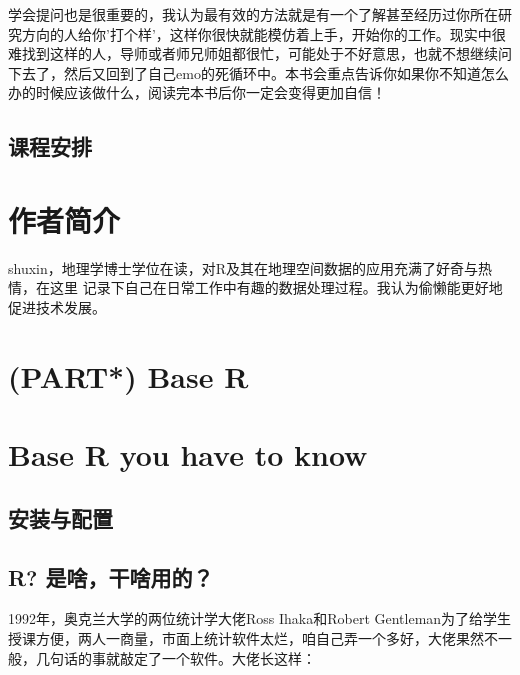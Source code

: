 \documentclass[
]{book}
\begin{document}
学会提问也是很重要的，我认为最有效的方法就是有一个了解甚至经历过你所在研究方向的人给你'打个样'，这样你很快就能模仿着上手，开始你的工作。现实中很难找到这样的人，导师或者师兄师姐都很忙，可能处于不好意思，也就不想继续问下去了，然后又回到了自己emo的死循环中。本书会重点告诉你如果你不知道怎么办的时候应该做什么，阅读完本书后你一定会变得更加自信！

\hypertarget{ux8bfeux7a0bux5b89ux6392}{%
\section{\texorpdfstring{\textbf{课程安排}}{课程安排}}\label{ux8bfeux7a0bux5b89ux6392}}

\hypertarget{ux4f5cux8005ux7b80ux4ecb}{%
\chapter{作者简介}\label{ux4f5cux8005ux7b80ux4ecb}}

shuxin，地理学博士学位在读，对R及其在地理空间数据的应用充满了好奇与热情，在这里
记录下自己在日常工作中有趣的数据处理过程。我认为偷懒能更好地促进技术发展。

\hypertarget{part-base-r}{%
\chapter{(PART*) Base R}\label{part-base-r}}

\hypertarget{base-r-you-have-to-know}{%
\chapter{Base R you have to know}\label{base-r-you-have-to-know}}

\hypertarget{ux5b89ux88c5ux4e0eux914dux7f6e}{%
\section{安装与配置}\label{ux5b89ux88c5ux4e0eux914dux7f6e}}

\hypertarget{r-ux662fux5565ux5e72ux5565ux7528ux7684}{%
\section{R? 是啥，干啥用的？}\label{r-ux662fux5565ux5e72ux5565ux7528ux7684}}

1992年，奥克兰大学的两位统计学大佬Ross Ihaka和Robert Gentleman为了给学生授课方便，两人一商量，市面上统计软件太烂，咱自己弄一个多好，大佬果然不一般，几句话的事就敲定了一个软件。大佬长这样：
\end{document}
